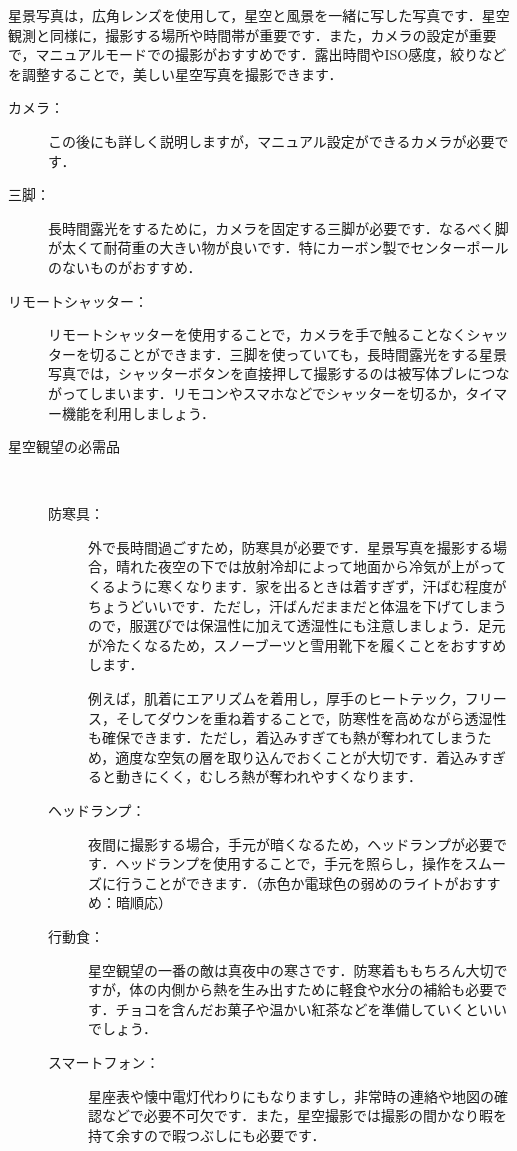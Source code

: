 \documentclass[main]{subfiles}
\begin{document}
星景写真は，広角レンズを使用して，星空と風景を一緒に写した写真です．星空観測と同様に，撮影する場所や時間帯が重要です．また，カメラの設定が重要で，マニュアルモードでの撮影がおすすめです．露出時間やISO感度，絞りなどを調整することで，美しい星空写真を撮影できます．

\begin{tcolorbox}[title=星景写真に必要な物, breakable]
	\begin{description}
		\item[カメラ：]この後にも詳しく説明しますが，マニュアル設定ができるカメラが必要です．
		\item[三脚：]長時間露光をするために，カメラを固定する三脚が必要です．なるべく脚が太くて耐荷重の大きい物が良いです．特にカーボン製でセンターポールのないものがおすすめ．
		\item[リモートシャッター：]リモートシャッターを使用することで，カメラを手で触ることなくシャッターを切ることができます．三脚を使っていても，長時間露光をする星景写真では，シャッターボタンを直接押して撮影するのは被写体ブレにつながってしまいます．リモコンやスマホなどでシャッターを切るか，タイマー機能を利用しましょう．
		\item[星空観望の必需品] \mbox{}\\
			\begin{description}
				\item[防寒具：] 外で長時間過ごすため，防寒具が必要です．星景写真を撮影する場合，晴れた夜空の下では放射冷却によって地面から冷気が上がってくるように寒くなります．家を出るときは着すぎず，汗ばむ程度がちょうどいいです．ただし，汗ばんだままだと体温を下げてしまうので，服選びでは保温性に加えて透湿性にも注意しましょう．足元が冷たくなるため，スノーブーツと雪用靴下を履くことをおすすめします．\mbox{}\par
					例えば，肌着にエアリズムを着用し，厚手のヒートテック，フリース，そしてダウンを重ね着することで，防寒性を高めながら透湿性も確保できます．ただし，着込みすぎても熱が奪われてしまうため，適度な空気の層を取り込んでおくことが大切です．着込みすぎると動きにくく，むしろ熱が奪われやすくなります．
				\item[ヘッドランプ：] 夜間に撮影する場合，手元が暗くなるため，ヘッドランプが必要です．ヘッドランプを使用することで，手元を照らし，操作をスムーズに行うことができます．（赤色か電球色の弱めのライトがおすすめ：暗順応）
				\item[行動食：] 星空観望の一番の敵は真夜中の寒さです．防寒着ももちろん大切ですが，体の内側から熱を生み出すために軽食や水分の補給も必要です．チョコを含んだお菓子や温かい紅茶などを準備していくといいでしょう．
				\item[スマートフォン：] 星座表や懐中電灯代わりにもなりますし，非常時の連絡や地図の確認などで必要不可欠です．また，星空撮影では撮影の間かなり暇を持て余すので暇つぶしにも必要です．
			\end{description}
	\end{description}
\end{tcolorbox}
\end{document}
